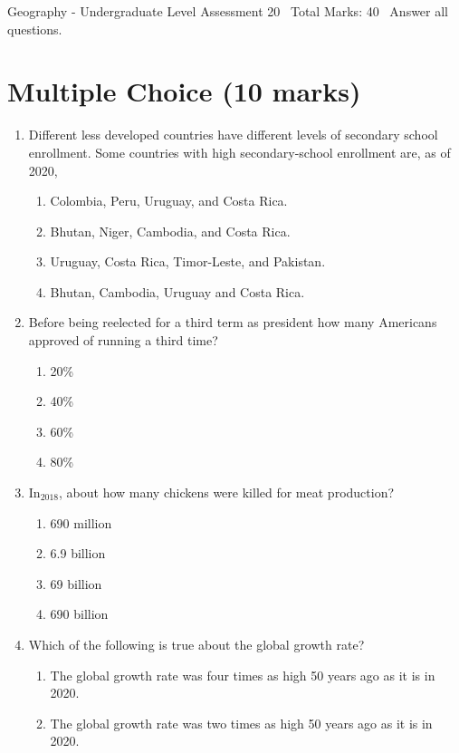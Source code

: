 \documentclass[12pt]{article}
\begin{document}
\begin{center}
Geography - Undergraduate Level Assessment 20 \
Total Marks: 40 \
Answer all questions.
\end{center}

\section*{Multiple Choice (10 marks)}
\begin{enumerate}[label=\arabic*.]
\item Different less developed countries have different levels of secondary school enrollment. Some countries with high secondary-school enrollment are, as of 2020,
\begin{enumerate}[label=(\alph*)]
    \item Colombia, Peru, Uruguay, and Costa Rica.
    \item Bhutan, Niger, Cambodia, and Costa Rica.
    \item Uruguay, Costa Rica, Timor-Leste, and Pakistan.
    \item Bhutan, Cambodia, Uruguay and Costa Rica.
\end{enumerate}
\item Before being reelected for a third term as president how many Americans approved of running a third time?
\begin{enumerate}[label=(\alph*)]
    \item 20\%
    \item 40\%
    \item 60\%
    \item 80\%
\end{enumerate}
\item In$_{2018}$, about how many chickens were killed for meat production?
\begin{enumerate}[label=(\alph*)]
    \item 690 million
    \item 6.9 billion
    \item 69 billion
    \item 690 billion
\end{enumerate}
\item Which of the following is true about the global growth rate?
\begin{enumerate}[label=(\alph*)]
    \item The global growth rate was four times as high 50 years ago as it is in 2020.
    \item The global growth rate was two times as high 50 years ago as it is in 2020.

\end{enumerate}
\end{enumerate}
\end{document}
